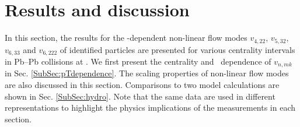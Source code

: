 \documentclass[ALICE,manyauthors]{cernphprep}
\begin{document}


\newpage

\section{Results and discussion}
\label{Sec:Results}

In this section, the results for the \pT-dependent non-linear flow modes $v_{4,22}$, $v_{5,32}$, $v_{6,33}$ and $v_{6,222}$ of identified particles are presented for various centrality intervals in Pb--Pb collisions at \sNN. We first present the centrality and \pT~dependence of $v_{n,mk}$ in Sec. \ref{SubSec:pTdependence}. The scaling properties of non-linear flow modes are also discussed in this section. Comparisons to two model calculations are shown in Sec. \ref{SubSec:hydro}. Note that the same data are used in different representations to highlight the physics implications of the measurements in each section. 
\end{document}
